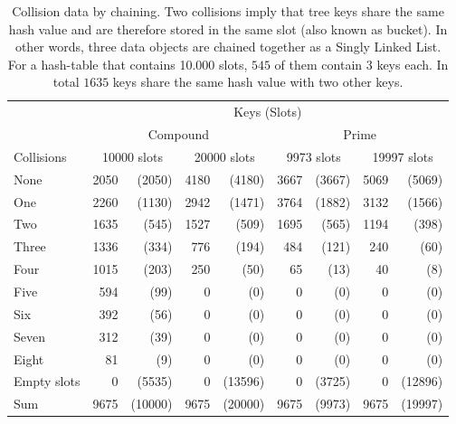 \documentclass[a4paper, 11pt]{article}
\begin{document}
    \begin{table}[h]
        \centering
        \small
\begin{tabular}{lrrrrrrrr}
\toprule
& \multicolumn{8}{c}{Keys (Slots)}\\
\cmidrule(lr){2-9}
& \multicolumn{4}{c}{Compound} &\multicolumn{4}{c}{Prime}\\
\cmidrule(lr){2-5}
\cmidrule(lr){6-9}
Collisions       & \multicolumn{2}{c}{\num{10000} slots} & \multicolumn{2}{c}{\num{20000} slots} & \multicolumn{2}{c}{\num{9973} slots} & \multicolumn{2}{c}{\num{19997} slots} \\
    \cmidrule(lr){1-1}
    \cmidrule(lr){2-3}
    \cmidrule(lr){4-5}
    \cmidrule(lr){6-7}
    \cmidrule(lr){8-9}

None  & \num{2050} & (\num{2050}) & \num{4180} & (\num{4180}) & \num{3667} & (\num{3667})& \num{5069}& (\num{5069})   \\
One  & \num{2260} & (\num{1130}) & \num{2942} & (\num{1471}) & \num{3764} & (\num{1882})& \num{3132}& (\num{1566})   \\
Two  & \num{1635} & (\num{545})  & \num{1527} & (\num{509})  & \num{1695} & (\num{565}) & \num{1194}& (\num{398})   \\
Three& \num{1336} & (\num{334})  & \num{776}  & (\num{194})  & \num{484}  & (\num{121}) & \num{240} & (\num{60})   \\
Four & \num{1015} & (\num{203})  & \num{250}  & (\num{50})   & \num{65}   & (\num{13})  & \num{40}  & (\num{8})   \\
Five & \num{594}  & (\num{99})   & \num{0}    & (\num{0})    & \num{0}    & (\num{0})   & \num{0}   & (\num{0})   \\
Six  & \num{392}  & (\num{56})   & \num{0}    & (\num{0})    & \num{0}    & (\num{0})   & \num{0}   & (\num{0})   \\
Seven& \num{312}  & (\num{39})   & \num{0}    & (\num{0})    & \num{0}    & (\num{0})   & \num{0}   & (\num{0})   \\
Eight& \num{81}   & (\num{9})    & \num{0}    & (\num{0})    & \num{0}    &(\num{0})    & \num{0}   & (\num{0})   \\
\hline
Empty slots& \num{0}& (\num{5535}) & \num{0}    &(\num{13596}) & \num{0}    &(\num{3725}) & \num{0}   & (\num{12896})\\
\hline
Sum              & \num{9675} & (\num{10000}) & \num{9675} & (\num{20000}) & \num{9675} & (\num{9973})&\num{9675} & (\num{19997})\\
\bottomrule
\end{tabular}
    \caption{Collision data by chaining. Two collisions imply that tree keys share the same
    hash value and are therefore stored in the same slot (also known as bucket).
    In other words, three data objects are chained together as a Singly Linked
    List. 
    For a hash-table that contains \num{10,000} slots, 
    $545$ of them contain 3 keys each. 
    In total $1635$ keys share the same hash value with two other keys.} %
    \label{tab:collision} %
    \end{table}
\end{document}
